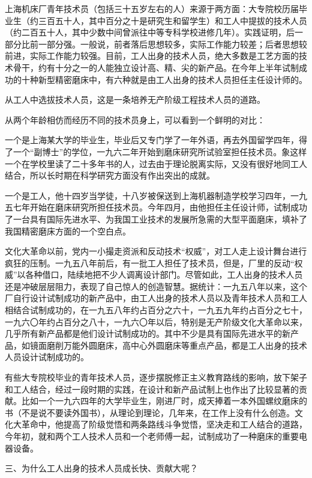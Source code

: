 \begin{maonote}
上海机床厂青年技术员（包括三十五岁左右的人）来源于两方面：大专院校历届毕业生（约三百五十人，其中百分之十是研究生和留学生）和工人中提拔的技术人员（约二百五十人，其中少数中间曾派往中等专科学校进修几年）。实践证明，后一部分比前一部分强。一般说，前者落后思想较多，实际工作能力较差；后者思想较前进，实际工作能力较强。目前，工人出身的技术人员，绝大多数是工艺方面的技术骨干，约有十分之一的人能独立设计高、精、尖的新产品。在今年上半年试制成功的十种新型精密磨床中，有六种就是由工人出身的技术人员担任主任设计师的。

从工人中选拔技术人员，这是一条培养无产阶级工程技术人员的道路。

从两个年龄相仿而经历不同的技术员身上，可以看到一个鲜明的对比：

一个是上海某大学的毕业生，毕业后又专门学了一年外语，再去外国留学四年，得了一个“副博士”的学位，一九六二年开始到磨床研究所试验室担任技术员。象这样一个在学校里读了二十多年书的人，过去由于理论脱离实际，又没有很好地同工人结合，所以长时期在科学研究方面没有作出突出的成就。

一个是工人，他十四岁当学徒，十八岁被保送到上海机器制造学校学习四年，一九五七年开始在磨床研究所担任技术员。今年四月，由他担任主任设计师，试制成功了一台具有国际先进水平、为我国工业技术的发展所急需的大型平面磨床，填补了我国精密磨床方面的一个空白点。

文化大革命以前，党内一小撮走资派和反动技术“权威”，对工人走上设计舞台进行疯狂的压制。一九五八年前后，有一批工人担任了技术员，但是，厂里的反动“权威”以各种借口，陆续地把不少人调离设计部门。尽管如此，工人出身的技术人员还是冲破层层阻力，表现了自己惊人的创造智慧。据统计：一九五八年以来，这个厂自行设计试制成功的新产品中，由工人出身的技术人员以及青年技术人员和工人相结合试制成功的，在一九五八年约占百分之六十，一九五九年约占百分之七十，一九六〇年约占百分之八十，一九六〇年以后，特别是无产阶级文化大革命以来，几乎所有新产品都是他们设计试制成功的。其中不少是具有国际先进水平的新产品，如镜面磨削万能外圆磨床，高中心外圆磨床等重点产品，都是工人出身的技术人员设计试制成功的。

有些大专院校毕业的青年技术人员，逐步摆脱修正主义教育路线的影响，放下架子和工人结合，经过一段时期的实践，在设计和新产品试制上也作出了比较显著的贡献。比如一个一九六四年的大学毕业生，刚进厂时，成天捧着一本外国螺纹磨床的书（不是说不要读外国书），从理论到理论，几年来，在工作上没有什么创造。文化大革命中，他提高了阶级觉悟和两条路线斗争觉悟，坚决走和工人结合的道路，今年初，就和两个工人技术人员和一个老师傅一起，试制成功了一种磨床的重要电器设备。

三、为什么工人出身的技术人员成长快、贡献大呢？


\end{maonote}

